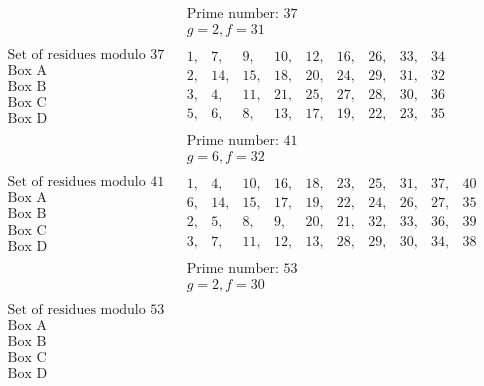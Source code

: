 \documentclass[twoside,12pt, showframe]{memoir}
\begin{document}
\[\begin{aligned}
& \begin{array}{c} \text{Prime number: }37 \\  g=2, f=31 \end{array} \\
\begin{array}{l} \text{Set of residues modulo }37 \\ \text{Box A} \\ \text{Box B} \\ \text{Box C} \\ \text{Box D} \end{array} & 
\begin{array}{|rrrrrrrrr} 
1,&7,&9,&10,&12,&16,&26,&33,&34 \\ 
2,& 14,&15,&18,&20,&24,&29,&31,&32 \\ 
3,& 4,& 11,&21,&25,&27,&28,&30,&36 \\ 
5,&6,&8,& 13,& 17,&19,&22,& 23,&35
\end{array} \\
& \begin{array}{c} \text{Prime number: }41 \\  g=6, f=32 \end{array} \\
\begin{array}{l} \text{Set of residues modulo }41 \\ \text{Box A} \\ \text{Box B} \\ \text{Box C} \\ \text{Box D} \end{array} & 
\begin{array}{|rrrrrrrrrr} 
1,&4,&10,&16,&18,&23,&25,&31,&37,&40 \\ 
6,& 14,&15,&17,&19,&22,&24,&26,&27,&35 \\ 
2,& 5,& 8,&9,&20,&21,&32,&33,&36,&39 \\ 
3,&7,&11,& 12,& 13,&28,&29,& 30,&34,&38
\end{array}  \\
& \begin{array}{c} \text{Prime number: }53 \\  g=2, f=30 \end{array} \\
\begin{array}{l} \text{Set of residues modulo }53 \\ \text{Box A} \\ \text{Box B} \\ \text{Box C} \\ \text{Box D} \end{array} & 

\end{aligned}\]
\end{document}
